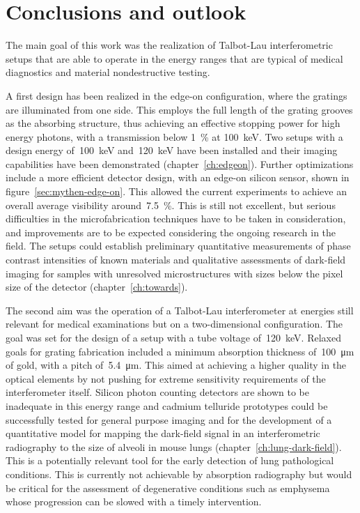 \chapter{Conclusions and outlook}\label{ch:conclusions}
The main goal of this work was the realization of Talbot-Lau interferometric
setups that are able to operate in the energy ranges that are typical of
medical diagnostics and material nondestructive testing.

A first design has been realized in the edge-on configuration, where the
gratings are illuminated from one side. This employs the full length of the
grating grooves as the absorbing structure, thus achieving an effective
stopping power for high energy photons, with a transmission below
\SI{1}{\percent} at \SI{100}{\kilo\eV}. Two setups with a design energy
of~\SI{100}{\kilo\eV} and~\SI{120}{\kilo\eV} have been installed and their
imaging capabilities have been demonstrated (chapter~\ref{ch:edgeon}).
Further optimizations include a more efficient detector design, with an
edge-on silicon sensor, shown in figure~\ref{sec:mythen-edge-on}. This
allowed the current experiments to achieve an overall average visibility
around~\SI{7.5}{\percent}. This is still not excellent, but serious
difficulties in the microfabrication techniques have to be taken in
consideration, and improvements are to be expected considering the ongoing
research in the field. The setups could establish preliminary quantitative
measurements of phase contrast intensities of known materials and
qualitative assessments of dark-field imaging for samples with unresolved
microstructures with sizes below the pixel size of the detector
(chapter~\ref{ch:towards}).

The second aim was the operation of a Talbot-Lau interferometer at energies
still relevant for medical examinations but on a two-dimensional
configuration. The goal was set for the design of a setup with a tube
voltage of~\SI{120}{\kilo\eV}. Relaxed goals for grating fabrication
included a minimum absorption thickness of~\SI{100}{\micro\meter} of gold,
with a pitch of~\SI{5.4}{\micro\meter}. This aimed at achieving a higher
quality in the optical elements by not pushing for extreme sensitivity
requirements of the interferometer itself.
Silicon photon counting detectors are shown
to be inadequate in this energy range and cadmium telluride prototypes could
be successfully tested for general purpose imaging and for the development
of a quantitative model for mapping the dark-field signal in an
interferometric radiography to the size of alveoli in mouse lungs
(chapter~\ref{ch:lung-dark-field}). This is a
potentially relevant tool for the early detection of lung pathological
conditions. This is currently not achievable by absorption radiography but
would be critical for the assessment of degenerative conditions such as
emphysema whose progression can be slowed with a timely intervention.

